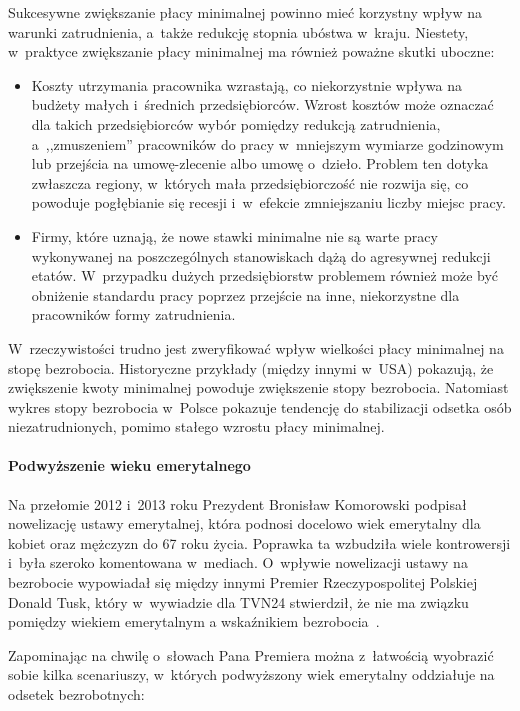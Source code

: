 \documentclass[12pt]{article}
\begin{document}
    Sukcesywne zwiększanie płacy minimalnej powinno mieć korzystny wpływ na warunki zatrudnienia, a~także redukcję stopnia ubóstwa w~kraju. Niestety, w~praktyce zwiększanie płacy minimalnej ma również poważne skutki uboczne:
    
    \begin{itemize}
        \item Koszty utrzymania pracownika wzrastają, co niekorzystnie wpływa na budżety małych i~średnich przedsiębiorców. Wzrost kosztów może oznaczać dla takich przedsiębiorców wybór pomiędzy redukcją zatrudnienia, a~,,zmuszeniem'' pracowników do pracy w~mniejszym wymiarze godzinowym lub przejścia na umowę-zlecenie albo umowę o~dzieło. Problem ten dotyka zwłaszcza regiony, w~których mała przedsiębiorczość nie rozwija się, co powoduje pogłębianie się recesji i~w~efekcie zmniejszaniu liczby miejsc pracy.
        \item Firmy, które uznają, że nowe stawki minimalne nie są warte pracy wykonywanej na poszczególnych stanowiskach dążą do agresywnej redukcji etatów. W~przypadku dużych przedsiębiorstw problemem również może być obniżenie standardu pracy poprzez przejście na inne, niekorzystne dla pracowników formy zatrudnienia.
    \end{itemize}

    W~rzeczywistości trudno jest zweryfikować wpływ wielkości płacy minimalnej na stopę bezrobocia. Historyczne przykłady (między innymi w~USA) pokazują, że zwiększenie kwoty minimalnej powoduje zwiększenie stopy bezrobocia. Natomiast wykres stopy bezrobocia w~Polsce pokazuje tendencję do stabilizacji odsetka osób niezatrudnionych, pomimo stałego wzrostu płacy minimalnej.
    
    \paragraph{Podwyższenie wieku emerytalnego}
    
    Na przełomie 2012 i~2013 roku Prezydent Bronisław Komorowski podpisał nowelizację ustawy emerytalnej, która podnosi docelowo wiek emerytalny dla kobiet oraz mężczyzn do 67 roku życia. Poprawka ta wzbudziła wiele kontrowersji i~była szeroko komentowana w~mediach. O~wpływie nowelizacji ustawy na bezrobocie wypowiadał się między innymi Premier Rzeczypospolitej Polskiej Donald Tusk, który w~wywiadzie dla TVN24 stwierdził, że nie ma związku pomiędzy wiekiem emerytalnym a wskaźnikiem bezrobocia~\cite{premier}.
    
    Zapominając na chwilę o~słowach Pana Premiera można z~łatwością wyobrazić sobie kilka scenariuszy, w~których podwyższony wiek emerytalny oddziałuje na odsetek bezrobotnych:
    
\end{document}

